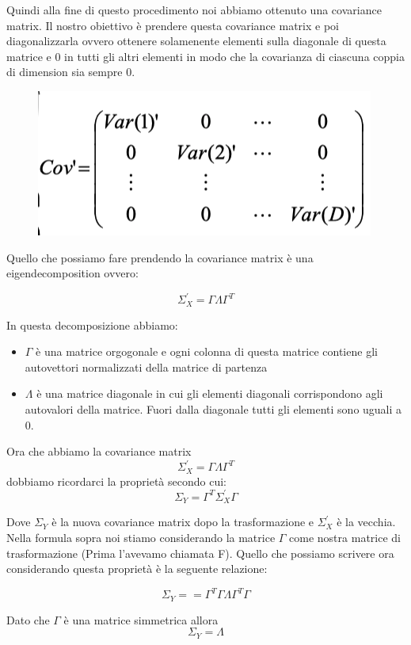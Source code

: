 \documentclass[14pt]{extreport}
\begin{document}
Quindi alla fine di questo procedimento noi abbiamo ottenuto una covariance matrix. Il nostro obiettivo è prendere questa covariance matrix e poi
diagonalizzarla ovvero ottenere solamenente elementi sulla diagonale di questa matrice e 0 in tutti gli altri elementi in modo che la covarianza di
ciascuna coppia di dimension sia sempre 0.

\begin{figure}[H]
	\centering
	\includegraphics[width=0.7\linewidth]{448.jpeg}
\end{figure}

Quello che possiamo fare prendendo la covariance matrix è una eigendecomposition ovvero:

$$\Sigma_X^{'} = \Gamma \Lambda \Gamma^T$$

In questa decomposizione abbiamo:

\begin{itemize}
	\item $\Gamma$ è una matrice orgogonale e ogni colonna di questa matrice contiene gli autovettori normalizzati della matrice di partenza
	\item $\Lambda$ è una matrice diagonale in cui gli elementi diagonali corrispondono agli autovalori della matrice. Fuori dalla diagonale tutti gli
	elementi sono uguali a 0.
\end{itemize}

Ora che abbiamo la covariance matrix $$\Sigma_X^{'} = \Gamma \Lambda \Gamma^T$$ dobbiamo ricordarci la proprietà secondo cui:
$$\Sigma_Y = \Gamma^T \Sigma_X^{'} \Gamma$$

Dove $\Sigma_Y$ è la nuova covariance matrix dopo la trasformazione e $\Sigma_X^{'}$ è la vecchia. Nella formula sopra noi stiamo considerando la
matrice $\Gamma$ come nostra matrice di trasformazione (Prima l'avevamo chiamata F). Quello che possiamo scrivere ora considerando questa proprietà è
la seguente relazione:

$$\Sigma_Y == \Gamma^T \Gamma \Lambda \Gamma^T \Gamma $$

Dato che $\Gamma$ è una matrice simmetrica allora $$\Sigma_Y = \Lambda $$
\end{document}
